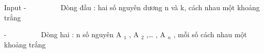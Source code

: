 Input
-          Dòng đầu : hai số nguyên dương n và k, cách nhau một khoảng trắng  

   -          Dòng hai : n số nguyên A   $_    1   $   , A   $_    2   $   ,… , A   $_    n   $   , mỗi số cách nhau một khoảng trắng